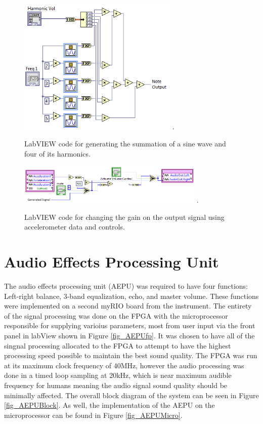 \begin{figure}[!t]
\centering
\includegraphics[width=3in]{NoteGeneration.png}
\DeclareGraphicsExtensions.
\caption{LabVIEW code for generating the summation of a sine wave and four of its harmonics.}
\label{fig_notegen}
\end{figure} 

\begin{figure}[!t]
\centering
\includegraphics[width=3.5in]{AccelerometerVolume.png}
\DeclareGraphicsExtensions.
\caption{LabVIEW code for changing the gain on the output signal using accelerometer data and controls.}
\label{fig_accvol}
\end{figure} 




\section{Audio Effects Processing Unit}
The audio effects processing unit (AEPU) was required to have four functions: Left-right balance, 3-band equalization, echo, and master volume. 
These functions were implemented on a second myRIO board from the instrument.
The entirety of the signal processing was done on the FPGA with the microprocessor responsible for supplying varioius parameters, most from user input via the front panel in labView shown in Figure \ref{fig_AEPUfp}. 
It was chosen to have all of the singnal processing allocated to the FPGA to attempt to have the highest processing speed possible to maintain the best sound quality.
The FPGA was run at its maximum clock frequency of 40MHz, however the audio processing was done in a timed loop sampling at 20kHz, which is near maximum audible frequency for humans meaning the audio signal sound quality should be minimally affected. 
The overall block diagram of the system can be seen in Figure \ref{fig_AEPUBlock}.
As well, the implementation of the AEPU on the microprocessor can be found in Figure \ref{fig_AEPUMicro}.

